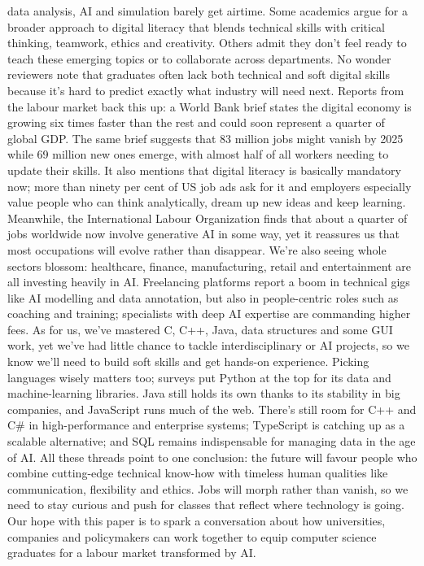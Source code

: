 \documentclass[final,5p,times,twocolumn]{elsarticle}
\begin{document}
data analysis, AI and simulation barely get airtime. Some academics argue for a broader approach to digital literacy that blends technical skills with critical thinking, teamwork, ethics and creativity. Others admit they don't feel ready to teach these emerging topics or to collaborate across departments. No wonder reviewers note that graduates often lack both technical and soft digital skills because it's hard to predict exactly what industry will need next. Reports from the labour market back this up: a World Bank brief states the digital economy is growing six times faster than the rest and could soon represent a quarter of global GDP. The same brief suggests that 83 million jobs might vanish by 2025 while 69 million new ones emerge, with almost half of all workers needing to update their skills. It also mentions that digital literacy is basically mandatory now; more than ninety per cent of US job ads ask for it and employers especially value people who can think analytically, dream up new ideas and keep learning. Meanwhile, the International Labour Organization finds that about a quarter of jobs worldwide now involve generative AI in some way, yet it reassures us that most occupations will evolve rather than disappear. We're also seeing whole sectors blossom: healthcare, finance, manufacturing, retail and entertainment are all investing heavily in AI. Freelancing platforms report a boom in technical gigs like AI modelling and data annotation, but also in people-centric roles such as coaching and training; specialists with deep AI expertise are commanding higher fees. As for us, we've mastered C, C++, Java, data structures and some GUI work, yet we've had little chance to tackle interdisciplinary or AI projects, so we know we'll need to build soft skills and get hands-on experience. Picking languages wisely matters too; surveys put Python at the top for its data and machine-learning libraries. Java still holds its own thanks to its stability in big companies, and JavaScript runs much of the web. There's still room for C++ and C\# in high-performance and enterprise systems; TypeScript is catching up as a scalable alternative; and SQL remains indispensable for managing data in the age of AI. All these threads point to one conclusion: the future will favour people who combine cutting-edge technical know-how with timeless human qualities like communication, flexibility and ethics. Jobs will morph rather than vanish, so we need to stay curious and push for classes that reflect where technology is going. Our hope with this paper is to spark a conversation about how universities, companies and policymakers can work together to equip computer science graduates for a labour market transformed by AI.
\end{document}
